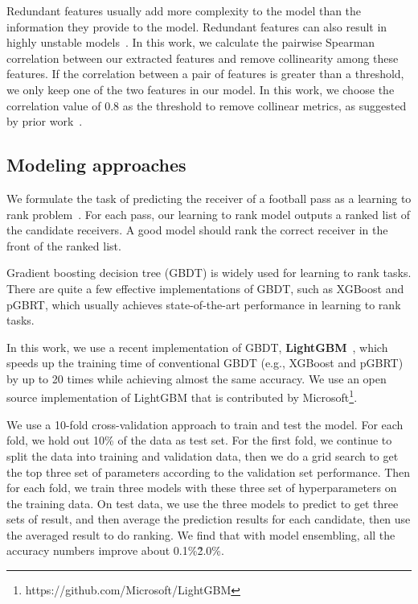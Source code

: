 Redundant features usually add more complexity to the model than the information they provide to the model. Redundant features can also result in highly unstable models~\cite{kuhn2013applied}.
In this work, we calculate the pairwise Spearman correlation between our extracted features and remove collinearity among these features.
If the correlation between a pair of features is greater than a threshold, we only keep one of the two features in our model.
In this work, we choose the correlation value of 0.8 as the threshold to remove collinear metrics, as suggested by prior work~\cite{kuhn2013applied}.

\subsection{Modeling approaches}

We formulate the task of predicting the receiver of a football pass as a learning to rank problem~\cite{liu2009learning}. 
For each pass, our learning to rank model outputs a ranked list of the candidate receivers. 
A good model should rank the correct receiver in the front of the ranked list.

Gradient boosting decision tree (GBDT) is widely used for learning to rank tasks.
There are quite a few effective implementations of GBDT, such as XGBoost and pGBRT, which usually achieves state-of-the-art performance in learning to rank tasks.

In this work, we use a recent implementation of GBDT, \textbf{LightGBM}~\cite{NIPS2017_6907}, which speeds up the training time of conventional GBDT (e.g., XGBoost and pGBRT) by up to 20 times while achieving almost the same accuracy. 
We use an open source implementation of LightGBM that is contributed by Microsoft\footnote{https://github.com/Microsoft/LightGBM}.


We use a 10-fold cross-validation approach to train and test the model. For each fold, we hold out 10\% of the data as test set. For the first fold, we continue to split the data into training and validation data, then we do a grid search to get the top three set of parameters according to the validation set performance. Then for each fold, we train three models with these three set of hyperparameters  on the training data. On test data, we use the three models to predict to get three sets of result, and then average the prediction results for each candidate, then use the averaged result to do ranking. We find that with model ensembling, all the accuracy numbers improve about 0.1\%\~2.0\%.

